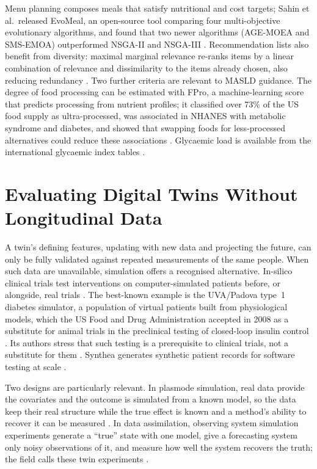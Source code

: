 Menu planning composes meals that satisfy nutritional and cost targets; Sahin et al.\ released EvoMeal, an open-source tool comparing four multi-objective evolutionary algorithms, and found that two newer algorithms (AGE-MOEA and SMS-EMOA) outperformed NSGA-II and NSGA-III \cite{sahin2024menu}. Recommendation lists also benefit from diversity: maximal marginal relevance re-ranks items by a linear combination of relevance and dissimilarity to the items already chosen, also reducing redundancy \cite{carbonell1998mmr}. Two further criteria are relevant to MASLD guidance. The degree of food processing can be estimated with FPro, a machine-learning score that predicts processing from nutrient profiles; it classified over 73\% of the US food supply as ultra-processed, was associated in NHANES with metabolic syndrome and diabetes, and showed that swapping foods for less-processed alternatives could reduce these associations \cite{menichetti2023processing}. Glycaemic load is available from the international glycaemic index tables \cite{atkinson2021gi}.

\section{Evaluating Digital Twins Without Longitudinal Data}
\label{sec:lr-insilico}

A twin's defining features, updating with new data and projecting the future, can only be fully validated against repeated measurements of the same people. When such data are unavailable, simulation offers a recognised alternative. In-silico clinical trials test interventions on computer-simulated patients before, or alongside, real trials \cite{pappalardo2019insilico}. The best-known example is the UVA/Padova type~1 diabetes simulator, a population of virtual patients built from physiological models, which the US Food and Drug Administration accepted in 2008 as a substitute for animal trials in the preclinical testing of closed-loop insulin control \cite{kovatchev2009insilico,dallaman2014simulator}. Its authors stress that such testing is a prerequisite to clinical trials, not a substitute for them \cite{kovatchev2009insilico}. Synthea generates synthetic patient records for software testing at scale \cite{walonoski2018synthea}.

Two designs are particularly relevant. In plasmode simulation, real data provide the covariates and the outcome is simulated from a known model, so the data keep their real structure while the true effect is known and a method's ability to recover it can be measured \cite{franklin2014plasmode}. In data assimilation, observing system simulation experiments generate a ``true'' state with one model, give a forecasting system only noisy observations of it, and measure how well the system recovers the truth; the field calls these twin experiments \cite{kalnay2003assimilation}.

